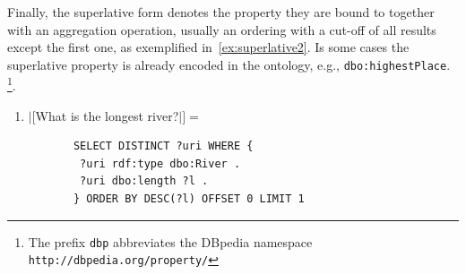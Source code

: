 \documentclass[11pt]{article}
\begin{document}
\vspace{-1.5em}
Finally, the superlative form denotes the property they are bound to together with an aggregation operation, 
usually an ordering with a cut-off of all results except the first one, as exemplified in~\ref{ex:superlative2}. 
Is some cases the superlative property is already encoded in the ontology, e.g., {\tt dbo:highestPlace}.
\footnote{The prefix \texttt{dbp} abbreviates the DBpedia namespace \texttt{http://dbpedia.org/property/}}.
\begin{enumerate}
\item $|[$What is the longest river?$|]=$
       \begin{small}\begin{verbatim}
       SELECT DISTINCT ?uri WHERE { 
        ?uri rdf:type dbo:River . 
        ?uri dbo:length ?l . 
       } ORDER BY DESC(?l) OFFSET 0 LIMIT 1 
       \end{verbatim}\end{small}
\label{ex:superlative2}
\end{enumerate}
\end{document}
